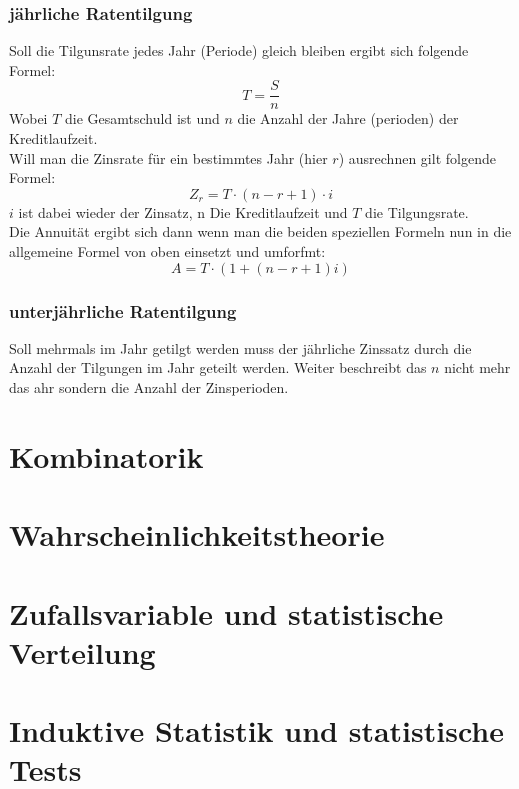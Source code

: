 \documentclass[a4paper]{scrartcl}
\begin{document}
            \subsubsection{jährliche Ratentilgung}
            Soll die Tilgunsrate jedes Jahr (Periode) gleich bleiben ergibt sich folgende Formel:
            \begin{equation*}
                T = \frac{S}{n}
            \end{equation*}
            Wobei \(T\) die Gesamtschuld ist und \(n\) die Anzahl der Jahre (perioden) der Kreditlaufzeit.\\
            Will man die Zinsrate für ein bestimmtes Jahr (hier \(r\)) ausrechnen gilt folgende Formel: 
            \begin{equation*}
                Z_r = T \cdot (n - r + 1) \cdot i
            \end{equation*} 
            \(i\) ist dabei wieder der Zinsatz, n Die Kreditlaufzeit und \(T\) die Tilgungsrate. \\
            Die Annuität ergibt sich dann wenn man die beiden speziellen Formeln nun in die allgemeine Formel von oben einsetzt und umforfmt: 
            \begin{equation*}
                A = T \cdot (1 + (n - r + 1)i)
            \end{equation*}

            \subsubsection{unterjährliche Ratentilgung}
            Soll mehrmals im Jahr getilgt werden muss der jährliche Zinssatz durch die Anzahl der Tilgungen im Jahr geteilt werden. Weiter beschreibt das \(n\) nicht mehr das ahr sondern die Anzahl
            der Zinsperioden.  
    \section{Kombinatorik}
    \section{Wahrscheinlichkeitstheorie}
    \section{Zufallsvariable und statistische Verteilung}
    \section{Induktive Statistik und statistische Tests}
\end{document}
